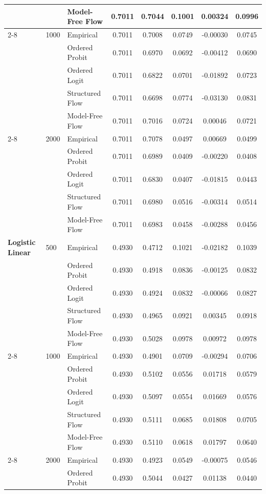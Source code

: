 \documentclass{article}
\numberwithin{figure}{section}
\numberwithin{table}{section}
\numberwithin{equation}{section}
\begin{document}
\begin{table}[ht]
\begin{tabular}{lllccccc}
 &  & Model-Free Flow & 0.7011 & 0.7044 & 0.1001 & 0.00324 & 0.0996 \\
\cline{2-8}
 & 1000 & Empirical & 0.7011 & 0.7008 & 0.0749 & -0.00030 & 0.0745 \\
 &  & Ordered Probit & 0.7011 & 0.6970 & 0.0692 & -0.00412 & 0.0690 \\
 &  & Ordered Logit & 0.7011 & 0.6822 & 0.0701 & -0.01892 & 0.0723 \\
 &  & Structured Flow & 0.7011 & 0.6698 & 0.0774 & -0.03130 & 0.0831 \\
 &  & Model-Free Flow & 0.7011 & 0.7016 & 0.0724 & 0.00046 & 0.0721 \\
\cline{2-8}
 & 2000 & Empirical & 0.7011 & 0.7078 & 0.0497 & 0.00669 & 0.0499 \\
 &  & Ordered Probit & 0.7011 & 0.6989 & 0.0409 & -0.00220 & 0.0408 \\
 &  & Ordered Logit & 0.7011 & 0.6830 & 0.0407 & -0.01815 & 0.0443 \\
 &  & Structured Flow & 0.7011 & 0.6980 & 0.0516 & -0.00314 & 0.0514 \\
 &  & Model-Free Flow & 0.7011 & 0.6983 & 0.0458 & -0.00288 & 0.0456 \\
\midrule
\textbf{Logistic Linear} & 500 & Empirical & 0.4930 & 0.4712 & 0.1021 & -0.02182 & 0.1039 \\
 &  & Ordered Probit & 0.4930 & 0.4918 & 0.0836 & -0.00125 & 0.0832 \\
 &  & Ordered Logit & 0.4930 & 0.4924 & 0.0832 & -0.00066 & 0.0827 \\
 &  & Structured Flow & 0.4930 & 0.4965 & 0.0921 & 0.00345 & 0.0918 \\
 &  & Model-Free Flow & 0.4930 & 0.5028 & 0.0978 & 0.00972 & 0.0978 \\
\cline{2-8}
 & 1000 & Empirical & 0.4930 & 0.4901 & 0.0709 & -0.00294 & 0.0706 \\
 &  & Ordered Probit & 0.4930 & 0.5102 & 0.0556 & 0.01718 & 0.0579 \\
 &  & Ordered Logit & 0.4930 & 0.5097 & 0.0554 & 0.01669 & 0.0576 \\
 &  & Structured Flow & 0.4930 & 0.5111 & 0.0685 & 0.01808 & 0.0705 \\
 &  & Model-Free Flow & 0.4930 & 0.5110 & 0.0618 & 0.01797 & 0.0640 \\
\cline{2-8}
 & 2000 & Empirical & 0.4930 & 0.4923 & 0.0549 & -0.00075 & 0.0546 \\
 &  & Ordered Probit & 0.4930 & 0.5044 & 0.0427 & 0.01138 & 0.0440 \\

\end{tabular}
\end{table}
\end{document}
